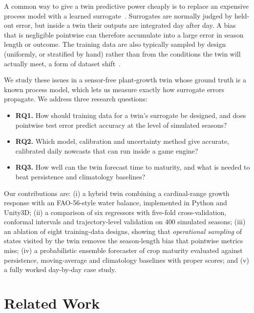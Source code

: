 \documentclass[conference]{IEEEtran}
\begin{document}
A common way to give a twin predictive power cheaply is to replace an expensive process model
with a learned surrogate~\cite{razavi2012review}. Surrogates are normally judged by held-out
error, but inside a twin their outputs are integrated day after day. A bias that is negligible
pointwise can therefore accumulate into a large error in season length or outcome. The training
data are also typically sampled by design (uniformly, or stratified by hand) rather than from the
conditions the twin will actually meet, a form of dataset shift~\cite{quinonero2009dataset}.

We study these issues in a sensor-free plant-growth twin whose ground truth is a known process
model, which lets us measure exactly how surrogate errors propagate. We address three research
questions:
\begin{itemize}
  \item \textbf{RQ1.} How should training data for a twin's surrogate be designed, and does
        pointwise test error predict accuracy at the level of simulated seasons?
  \item \textbf{RQ2.} Which model, calibration and uncertainty method give accurate, calibrated
        daily nowcasts that can run inside a game engine?
  \item \textbf{RQ3.} How well can the twin forecast time to maturity, and what is needed to beat
        persistence and climatology baselines?
\end{itemize}

Our contributions are: (i) a hybrid twin combining a cardinal-range growth response with an
FAO-56-style water balance, implemented in Python and Unity3D; (ii) a comparison of six
regressors with five-fold cross-validation, conformal intervals and trajectory-level validation
on 400 simulated seasons; (iii) an ablation of eight training-data designs, showing that
\emph{operational sampling} of states visited by the twin removes the season-length bias that
pointwise metrics miss; (iv) a probabilistic ensemble forecaster of crop maturity evaluated
against persistence, moving-average and climatology baselines with proper scores; and (v) a
fully worked day-by-day case study.

\section{Related Work}
\end{document}
